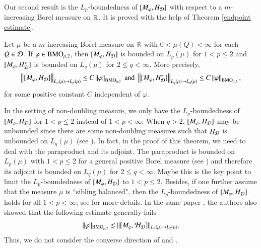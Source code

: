 \documentclass[leqno]{amsart}
\begin{document}
Our second result is the $L_{p}$-boundedness of $[M_{\varphi},H_{{\mathcal D}}]$ with respect to a $m$-increasing Borel measure on ${\mathbb R}$. It is proved with the help of Theorem \ref{endpoint estimate}.

\begin{theorem}\label{Lp estimate}
Let $\mu$ be a $m$-increasing Borel measure on ${\mathbb R}$ with $0<\mu(Q)<\infty$ for each $Q\in{\mathcal D}$. If $\varphi\in{\rm BMO}_{\mu,2}$, then $[M_{\varphi},H_{{\mathcal D}}]$ is bounded on $L_{p}(\mu)$  for  $1<p\leq2$ and $[M_{\varphi},H_{{\mathcal D}}^{*}]$ is bounded on $L_{q}(\mu)$  for  $2\leq q<\infty$. 
More precisely,
\begin{align*}
\left\| [M_{\varphi},H_{{\mathcal D}}] \right\|_{L_{p}(\mu)\rightarrow L_{p}(\mu)}
\leq C\left\| \varphi \right\|_{{\rm BMO}_{\mu,2}}\;\mbox{and}\;
\left\| [M_{\varphi},H_{{\mathcal D}}^{*}] \right\|_{L_{q}(\mu)\rightarrow L_{q}(\mu)}
\leq C\left\| \varphi \right\|_{{\rm BMO}_{\mu,2}},
\end{align*}
for some positive constant $C$ independent of $\varphi$.
\end{theorem}

In the setting of non-doubling measure, we only have the $L_{p}$-boundedness of $[M_{\varphi},H_{{\mathcal D}}]$ for $1<p\leq2$ instead of $1<p<\infty$. When $q>2$, $[M_{\varphi},H_{{\mathcal D}}]$ may be unbounded since there are some non-doubling measures such that $H_{{\mathcal D}}$ is unbounded on $L_{q}(\mu)$ (see \cite[Section 4.1]{LMP2014}). In fact, in the proof of this theorem, we need to deal with the paraproduct and its adjoint. The paraproduct is bounded on $L_{p}(\mu)$ with $1<p\leq2$ for a general positive Borel measure (see ) and therefore its adjoint is bounded on $L_{q}(\mu)$ for $2\leq q<\infty$. Maybe this is the key point to limit the $L_{p}$-boundedness of $[M_{\varphi},H_{{\mathcal D}}]$ to $1<p\leq2$.
Besides, if one further assume that the measure $\mu$ is ``sibling balanced", then the $L_{p}$-boundedness of $[M_{\varphi},H_{{\mathcal D}}]$ holds for all $1<p<\infty$; see \cite{BCPW2024} for more details. In the same paper \cite[Theorem A]{BCPW2024}, the authors also showed that the following estimate generally fails
$$\|\varphi\|_{{\rm BMO}_{\mu,2}}\lesssim \|[M_{\varphi},\mathcal{H}_{\mathcal{D}}]\|_{L_2(\mu)\to L_2(\mu)}.$$
Thus, we do not consider the converse direction of  and .
\end{document}
